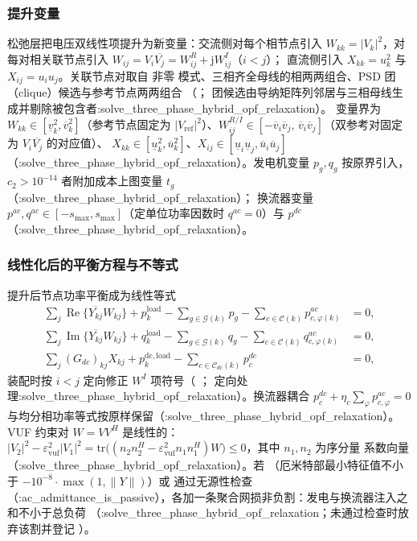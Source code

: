 \subsubsection*{提升变量}
松弛层把电压双线性项提升为新变量：交流侧对每个相节点引入
$W_{kk}=|V_k|^2$，对每对相关联节点引入
$W_{ij}=V_i\overline{V_j}=W^{R}_{ij}+\mathrm{j}W^{I}_{ij}$（$i<j$）；
直流侧引入 $X_{kk}=u_k^2$ 与 $X_{ij}=u_i u_j$。关联节点对取自  非零
模式、三相齐全母线的相两两组合、PSD 团（clique）候选与参考节点两两组合
（；
团候选由导纳矩阵列邻居与三相母线生成并剔除被包含者:solve\_three\_phase\_hybrid\_opf\_relaxation）。
变量界为 $W_{kk}\in[\underline{v}_k^2,\overline{v}_k^2]$（参考节点固定为
$|V_{\mathrm{ref}}|^2$）、$W^{R/I}_{ij}\in[-\overline{v}_i\overline{v}_j,\,
\overline{v}_i\overline{v}_j]$（双参考对固定为 $V_i\overline{V_j}$ 的对应值）、
$X_{kk}\in[\underline{u}_k^2,\overline{u}_k^2]$、$X_{ij}\in[\underline{u}_i
\underline{u}_j,\overline{u}_i\overline{u}_j]$（:solve\_three\_phase\_hybrid\_opf\_relaxation）。发电机变量
$p_g,q_g$ 按原界引入，$c_2>10^{-14}$ 者附加成本上图变量 $t_g$（:solve\_three\_phase\_hybrid\_opf\_relaxation）；
换流器变量 $p^{ac},q^{ac}\in[-s_{\max},s_{\max}]$（定单位功率因数时
$q^{ac}=0$）与 $p^{dc}$（:solve\_three\_phase\_hybrid\_opf\_relaxation）。

\subsubsection*{线性化后的平衡方程与不等式}
提升后节点功率平衡成为线性等式
\begin{align*}
\sum_{j}\operatorname{Re}\{\overline{Y_{kj}}W_{kj}\} + p^{\mathrm{load}}_k
  - \sum_{g\in\mathcal{G}(k)} p_g - \sum_{c\in\mathcal{C}(k)} p^{ac}_{c,\varphi(k)} &= 0,\\
\sum_{j}\operatorname{Im}\{\overline{Y_{kj}}W_{kj}\} + q^{\mathrm{load}}_k
  - \sum_{g\in\mathcal{G}(k)} q_g - \sum_{c\in\mathcal{C}(k)} q^{ac}_{c,\varphi(k)} &= 0,\\
\sum_{j} (G_{dc})_{kj}X_{kj} + p^{\mathrm{dc,load}}_k
  - \sum_{c\in\mathcal{C}_{dc}(k)} p^{dc}_c &= 0,
\end{align*}
装配时按 $i<j$ 定向修正 $W^{I}$ 项符号（
；
定向处理:solve\_three\_phase\_hybrid\_opf\_relaxation）。换流器耦合 $p^{dc}_c+\eta_c\sum_\varphi p^{ac}_{c,\varphi}=0$
与均分相功率等式按原样保留（:solve\_three\_phase\_hybrid\_opf\_relaxation）。VUF 约束对 $W=VV^{H}$ 是线性的：
$|V_2|^2-\varepsilon_{\mathrm{vuf}}^2|V_1|^2=\mathrm{tr}\bigl((n_2n_2^{H}-
\varepsilon_{\mathrm{vuf}}^2 n_1n_1^{H})W\bigr)\le 0$，其中 $n_1,n_2$ 为序分量
系数向量（:solve\_three\_phase\_hybrid\_opf\_relaxation）。若 （厄米特部最小特征值不小于
$-10^{-8}\cdot\max(1,\lVert Y\rVert)$）或  通过无源性检查
（:ac\_admittance\_is\_passive），各加一条聚合网损非负割：发电与换流器注入之和不小于总负荷
（:solve\_three\_phase\_hybrid\_opf\_relaxation；未通过检查时放弃该割并登记 ）。

